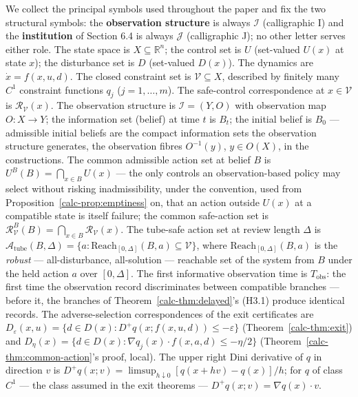 \documentclass[10pt,twocolumn]{article}
\theoremstyle{definition}
\begin{document}
We collect the principal symbols used throughout the paper and fix the two structural symbols: the \textbf{observation structure} is always
\(\mathcal{I}\) (calligraphic I) and the \textbf{institution} of Section
6.4 is always \(\mathcal{J}\) (calligraphic J); no other letter serves either role. The state space is \(X \subseteq \mathbb{R}^n\); the
control set is \(U\) (set-valued \(U(x)\) at state \(x\)); the
disturbance set is \(D\) (set-valued \(D(x)\)). The dynamics are
\(\dot x = f(x,u,d)\). The closed constraint set is
\(\mathcal{V} \subseteq X\), described by finitely many \(C^1\)
constraint functions \(q_j\) (\(j = 1,\ldots,m\)). The safe-control
correspondence at \(x \in \mathcal{V}\) is
\(\mathcal{R}_{\mathcal{V}}(x)\). The observation structure is
\(\mathcal{I} = (Y, O)\) with observation map \(O : X \to Y\); the
information set (belief) at time \(t\) is \(B_t\); the initial belief is
\(B_0\) --- admissible initial beliefs are the compact information sets
the observation structure generates, the observation fibres
\(O^{-1}(y)\), \(y \in O(X)\), in the constructions. The common
admissible action set at belief \(B\) is
\(U^B(B) = \bigcap_{x \in B} U(x)\) --- the only controls an
observation-based policy may select without risking inadmissibility,
under the convention, used from Proposition~\ref{calc-prop:emptiness} on, that an action outside
\(U(x)\) at a compatible state is itself failure; the common safe-action
set is
\(\mathcal{R}_{\mathcal{V}}^B(B) = \bigcap_{x \in B} \mathcal{R}_{\mathcal{V}}(x)\).
The tube-safe action set at review length \(\Delta\) is
\(\mathcal{A}_{\mathrm{tube}}(B, \Delta) = \{ a : \mathrm{Reach}_{[0,\Delta]}(B, a) \subseteq \mathcal{V} \}\),
where \(\mathrm{Reach}_{[0,\Delta]}(B, a)\) is the \emph{robust} ---
all-disturbance, all-solution --- reachable set of the system from \(B\) under the
held action \(a\) over \([0,\Delta]\). The first informative observation
time is \(T_{\mathrm{obs}}\): the first time the observation record
discriminates between compatible branches --- before it, the branches of
Theorem~\ref{calc-thm:delayed}'s (H3.1) produce identical records. The adverse-selection
correspondences of the exit certificates are
\(D_{\varepsilon}(x,u) = \{ d \in D(x) : D^+ q(x; f(x,u,d)) \le -\varepsilon \}\)
(Theorem~\ref{calc-thm:exit}) and
\(D_{\eta}(x) = \{ d \in D(x) : \nabla q_j(x) \cdot f(x, a, d) \le -\eta/2 \}\)
(Theorem~\ref{calc-thm:common-action}'s proof, local). The upper
right Dini derivative of \(q\) in direction \(v\) is
\(D^+ q(x; v) = \limsup_{h \downarrow 0} [q(x + hv) - q(x)]/h\); for
\(q\) of class \(C^1\) --- the class assumed in the exit theorems ---
\(D^+ q(x; v) = \nabla q(x) \cdot v\).
\end{document}
